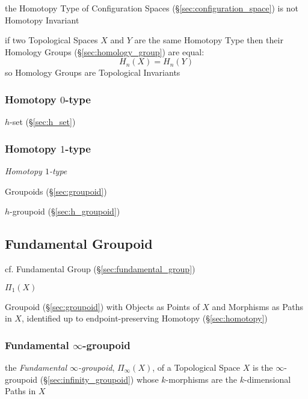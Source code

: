 the Homotopy Type of Configuration Spaces (\S\ref{sec:configuration_space}) is
not Homotopy Invariant

if two Topological Spaces $X$ and $Y$ are the same Homotopy Type then their
Homology Groups (\S\ref{sec:homology_group}) are equal:
\[
  H_n(X) = H_n(Y)
\]
so Homology Groups are Topological Invariants



\subsubsection{Homotopy $0$-type}\label{sec:homotopy_0type}

$h$-set (\S\ref{sec:h_set})



\subsubsection{Homotopy $1$-type}\label{sec:homotopy_1type}

\emph{Homotopy $1$-type}

Groupoids (\S\ref{sec:groupoid})

$h$-groupoid (\S\ref{sec:h_groupoid})



\subsection{Fundamental Groupoid}\label{sec:fundamental_groupoid}

cf. Fundamental Group (\S\ref{sec:fundamental_group})

$\Pi_1(X)$

Groupoid (\S\ref{sec:groupoid}) with Objects as Points of $X$ and Morphisms as
Paths in $X$, identified up to endpoint-preserving Homotopy
(\S\ref{sec:homotopy})



\subsubsection{Fundamental $\infty$-groupoid}
\label{sec:fundamental_infinity_groupoid}


the \emph{Fundamental $\infty$-groupoid}, $\Pi_\infty(X)$, of a Topological
Space $X$ is the $\infty$-groupoid (\S\ref{sec:infinity_groupoid}) whose
$k$-morphisms are the $k$-dimensional Paths in $X$




